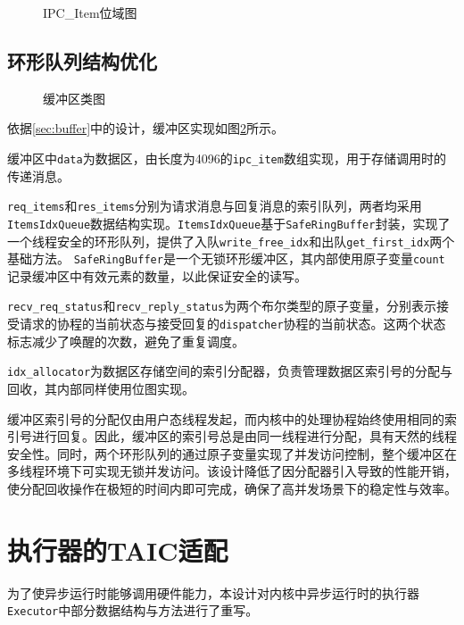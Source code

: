 \begin{figure}[htbp]
  \centering
  
  \caption{IPC\_Item位域图}\label{ipc_item结构}
\end{figure}



\subsection{环形队列结构优化}

\begin{figure}[htbp]
  \centering
  
  \caption{缓冲区类图}\label{缓冲区类图}
\end{figure}

依据\ref{sec:buffer}中的设计，缓冲区实现如图\ref{缓冲区类图}所示。

缓冲区中\texttt{data}为数据区，由长度为4096的\texttt{ipc\_item}数组实现，用于存储调用时的传递消息。

\texttt{req\_items}和\texttt{res\_items}分别为请求消息与回复消息的索引队列，两者均采用\texttt{ItemsIdxQueue}数据结构实现。\texttt{ItemsIdxQueue}基于\texttt{SafeRingBuffer}封装，实现了一个线程安全的环形队列，提供了入队\texttt{write\_free\_idx}和出队\texttt{get\_first\_idx}两个基础方法。
\texttt{SafeRingBuffer}是一个无锁环形缓冲区，其内部使用原子变量\texttt{count}记录缓冲区中有效元素的数量，以此保证安全的读写。

\texttt{recv\_req\_status}和\texttt{recv\_reply\_status}为两个布尔类型的原子变量，分别表示接受请求的协程的当前状态与接受回复的\texttt{dispatcher}协程的当前状态。这两个状态标志减少了唤醒的次数，避免了重复调度。

\texttt{idx\_allocator}为数据区存储空间的索引分配器，负责管理数据区索引号的分配与回收，其内部同样使用位图实现。

缓冲区索引号的分配仅由用户态线程发起，而内核中的处理协程始终使用相同的索引号进行回复。因此，缓冲区的索引号总是由同一线程进行分配，具有天然的线程安全性。同时，两个环形队列的通过原子变量实现了并发访问控制，整个缓冲区在多线程环境下可实现无锁并发访问。该设计降低了因分配器引入导致的性能开销，使分配回收操作在极短的时间内即可完成，确保了高并发场景下的稳定性与效率。

\section{执行器的TAIC适配}

为了使异步运行时能够调用硬件能力，本设计对内核中异步运行时的执行器\texttt{Executor}中部分数据结构与方法进行了重写。

